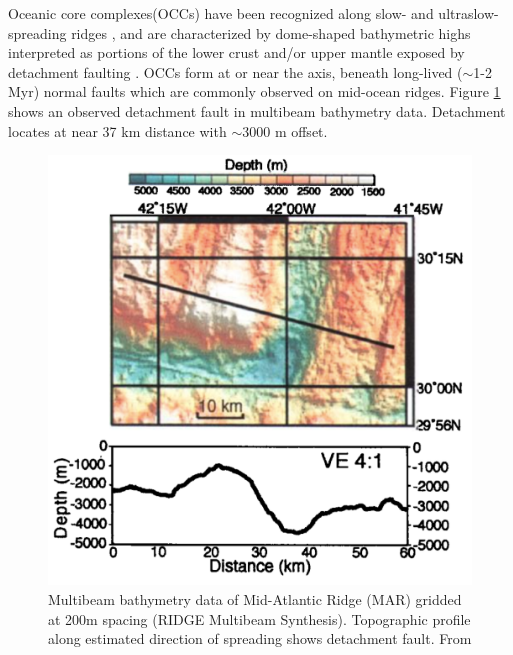 \documentclass[letterpaper,12pt,notitle]{memphisthesis}                     %
\begin{document}

%
%
%

Oceanic core complexes(OCCs) have been recognized along slow- and ultraslow- spreading ridges \citep{Tucholke1998}, and are characterized by dome-shaped bathymetric highs interpreted as portions of the lower crust and/or upper mantle exposed by detachment faulting \citep{Tucholke1994}. OCCs form at or near the axis, beneath long-lived ($\sim$1-2 Myr) normal faults which are commonly observed on mid-ocean ridges. Figure \ref{fig:occ} shows an observed detachment fault in multibeam bathymetry data. Detachment locates at near 37 km distance with $\sim$3000 m offset.
%
\begin{figure}[!htb]
	\centering
	\includegraphics[width=0.6\linewidth]{./figs/occ.png}
	\caption{Multibeam bathymetry data of Mid-Atlantic Ridge (MAR) gridded at 200m spacing (RIDGE Multibeam Synthesis). Topographic profile along estimated direction of spreading shows detachment fault. From \citet{Lavier2000}}
	\label{fig:occ}
\end{figure}
%
\end{document}
